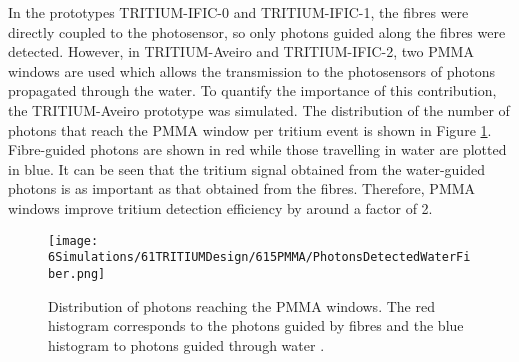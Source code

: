 In the prototypes TRITIUM-IFIC-0 and TRITIUM-IFIC-1, the fibres were directly coupled to the photosensor, so only photons guided along the fibres were detected. However, in TRITIUM-Aveiro and TRITIUM-IFIC-2, two PMMA windows are used which allows the transmission to the photosensors of photons propagated through the water. To quantify the importance of this contribution, the TRITIUM-Aveiro prototype was simulated. The distribution of the number of photons that reach the PMMA window per tritium event is shown in Figure \ref{fig:PMMAEffect}. Fibre-guided photons are shown in red while those travelling in water are plotted in blue. It can be seen that the tritium signal obtained from the water-guided photons is as important as that obtained from the fibres. Therefore, PMMA windows improve tritium detection efficiency by around a factor of 2.

\begin{figure}[t]
\centering
\texttt{[image: 6Simulations/61TRITIUMDesign/615PMMA/PhotonsDetectedWaterFiber.png]}
\caption{Distribution of photons reaching the PMMA windows. The red histogram corresponds to the photons guided by fibres and the blue histogram to photons guided through water \cite{SimulationPaperCarlos}.\label{fig:PMMAEffect}}
\end{figure}

